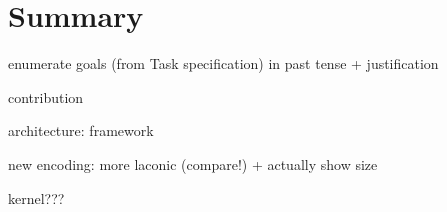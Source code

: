 \chapter{Summary}
\label{ch:summary}

enumerate goals (from Task specification) in past tense + justification

contribution

  architecture:  framework

  new encoding: more laconic (compare!) + actually show size

  kernel???
